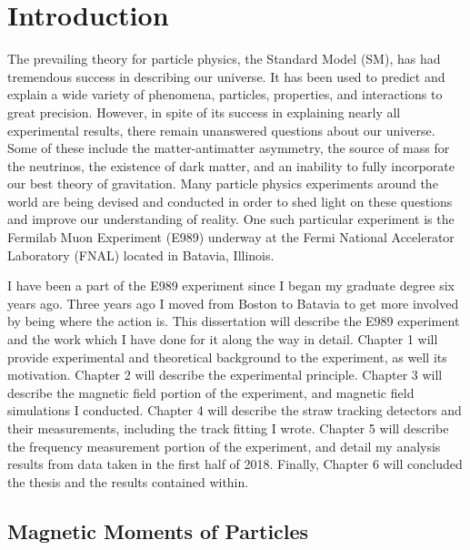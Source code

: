 
\thispagestyle{myheadings}
\graphicspath{{Body/Figures/Theory/}}

\chapter{Introduction}
\label{chapter:Introduction}

The prevailing theory for particle physics, the Standard Model (SM), has had tremendous success in describing our universe. It has been used to predict and explain a wide variety of phenomena, particles, properties, and interactions to great precision. However, in spite of its success in explaining nearly all experimental results, there remain unanswered questions about our universe. Some of these include the matter-antimatter asymmetry, the source of mass for the neutrinos, the existence of dark matter, and an inability to fully incorporate our best theory of gravitation. Many particle physics experiments around the world are being devised and conducted in order to shed light on these questions and improve our understanding of reality. One such particular experiment is the Fermilab Muon \gmtwo Experiment (E989) underway at the Fermi National Accelerator Laboratory (FNAL) located in Batavia, Illinois.

I have been a part of the E989 experiment since I began my graduate degree six years ago. Three years ago I moved from Boston to Batavia to get more involved by being where the action is. This dissertation will describe the E989 experiment and the work which I have done for it along the way in detail. Chapter 1 will provide experimental and theoretical background to the experiment, as well its motivation. Chapter 2 will describe the experimental principle. Chapter 3 will describe the magnetic field portion of the experiment, and magnetic field simulations I conducted. Chapter 4 will describe the straw tracking detectors and their measurements, including the track fitting I wrote. Chapter 5 will describe the frequency measurement portion of the experiment, and detail my analysis results from data taken in the first half of 2018. Finally, Chapter 6 will concluded the thesis and the results contained within.


\section{Magnetic Moments of Particles}
\label{sec:MDMs}

